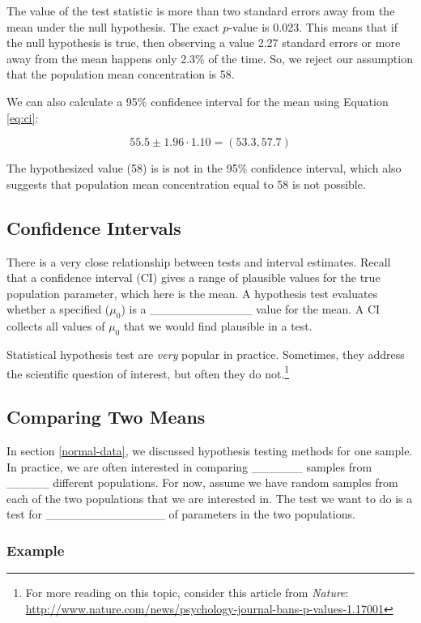 \documentclass[]{book}
\let\rmarkdownfootnote\footnote%
\def\footnote{\protect\rmarkdownfootnote}
\theoremstyle{definition}
\theoremstyle{definition}
\theoremstyle{remark}
\begin{document}
The value of the test statistic is more than two standard errors away
from the mean under the null hypothesis. The exact \(p\)-value is 0.023.
This means that if the null hypothesis is true, then observing a value
2.27 standard errors or more away from the mean happens only 2.3\% of
the time. So, we reject our assumption that the population mean
concentration is 58.

We can also calculate a 95\% confidence interval for the mean using
Equation \ref{eq:ci}:

\[55.5 \pm 1.96\cdot 1.10 = (53.3, 57.7)\]

The hypothesized value (58) is is not in the 95\% confidence interval,
which also suggests that population mean concentration equal to 58 is
not possible.

\subsection{Confidence Intervals}\label{confidence-intervals}

There is a very close relationship between tests and interval estimates.
Recall that a confidence interval (CI) gives a range of plausible values
for the true population parameter, which here is the mean. A hypothesis
test evaluates whether a specified (\(\mu_0\)) is a
\_\_\_\_\_\_\_\_\_\_\_\_ value for the mean. A CI collects all values of
\(\mu_0\) that we would find plausible in a test.

Statistical hypothesis test are \emph{very} popular in practice.
Sometimes, they address the scientific question of interest, but often
they do not.\footnote{For more reading on this topic, consider this
  article from \emph{Nature}:
  \url{http://www.nature.com/news/psychology-journal-bans-p-values-1.17001}}

\subsection{Comparing Two Means}\label{comparing-two-means}

In section \ref{normal-data}, we discussed hypothesis testing methods
for one sample. In practice, we are often interested in comparing
\_\_\_\_\_\_ samples from \_\_\_\_\_ different populations. For now,
assume we have random samples from each of the two populations that we
are interested in. The test we want to do is a test for
\_\_\_\_\_\_\_\_\_\_\_\_\_\_ of parameters in the two populations.

\subsubsection{Example}\label{example-1}
\end{document}
